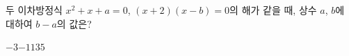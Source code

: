 두 이차방정식 $x^2+x+a=0$, $(x+2)(x-b)=0$의 해가 같을 때, 상수 $a$, $b$에 대하여 $b-a$의 값은?
\begin{choices32}{$-3$}{$-1$}{$1$}{$3$}{$5$}\end{choices32}
